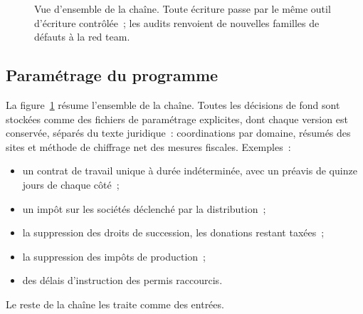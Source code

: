 \documentclass[11pt,a4paper]{article}
\begin{document}
\begin{figure}[ht]
\centering
{}
\caption{Vue d'ensemble de la chaîne. Toute écriture passe par le même outil d'écriture contrôlée~; les audits renvoient de nouvelles familles de défauts à la red team.}
\label{fig:pipeline}
\end{figure}

\subsection{Paramétrage du programme}
\label{sec:policy}

La figure~\ref{fig:pipeline} résume l'ensemble de la chaîne. Toutes les décisions de fond sont stockées comme des fichiers de paramétrage explicites, dont chaque version est conservée, séparés du texte juridique~: coordinations par domaine, résumés des sites et méthode de chiffrage net des mesures fiscales. Exemples~:
\begin{itemize}
  \item un contrat de travail unique à durée indéterminée, avec un préavis de quinze jours de chaque côté~;
  \item un impôt sur les sociétés déclenché par la distribution~;
  \item la suppression des droits de succession, les donations restant taxées~;
  \item la suppression des impôts de production~;
  \item des délais d'instruction des permis raccourcis.
\end{itemize}
Le reste de la chaîne les traite comme des entrées.
\end{document}

